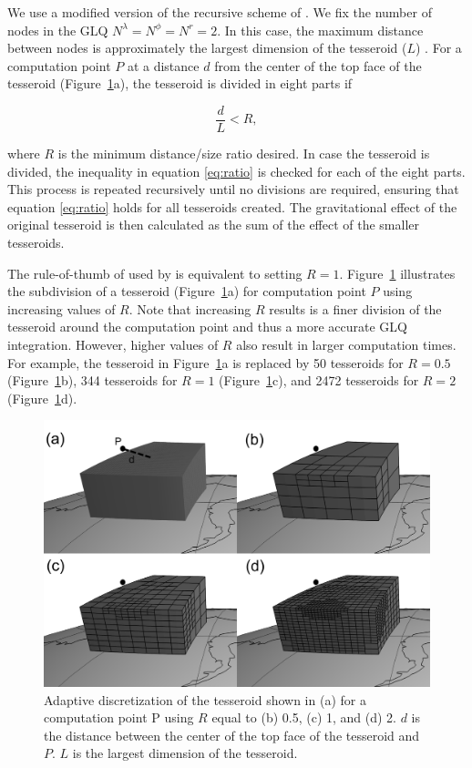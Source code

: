 \documentclass[paper,twocolumn,twoside]{geophysics}
\begin{document}
We use a modified version
of the recursive scheme of \citet{Li2011}.
We fix the number of nodes in the GLQ
$N^\lambda=N^\phi=N^r=2$.
In this case, the maximum distance between nodes
is approximately the largest dimension of the tesseroid ($L$)
\citep{Wild-Pfeiffer2008}.
For a computation point $P$
at a distance $d$ from
the center of the top face of the tesseroid
(Figure~\ref{fig:ratio}a),
the tesseroid is divided in eight parts if

\begin{equation}
    \frac{d}{L} < R,
    \label{eq:ratio}
\end{equation}

\noindent
where $R$ is the minimum distance/size ratio desired.
In case the tesseroid is divided,
the inequality in equation \ref{eq:ratio}
is checked for each of the eight parts.
This process is repeated recursively
until no divisions are required,
ensuring that equation \ref{eq:ratio}
holds for all tesseroids created.
The gravitational effect
of the original tesseroid
is then calculated as
the sum of the effect
of the smaller tesseroids.

The rule-of-thumb of \citet{Ku1977}
used by \citet{Li2011}
is equivalent to setting $R=1$.
Figure~\ref{fig:ratio}
illustrates the subdivision of a tesseroid
(Figure~\ref{fig:ratio}a)
for computation point $P$
using increasing values of $R$.
Note that increasing $R$
results is a finer division of the tesseroid
around the computation point
and thus a more accurate GLQ integration.
However, higher values of $R$
also result in
larger computation times.
For example,
the tesseroid in Figure~\ref{fig:ratio}a
is replaced by
50 tesseroids for $R=0.5$ (Figure~\ref{fig:ratio}b),
344 tesseroids for $R=1$ (Figure~\ref{fig:ratio}c),
and 2472 tesseroids for  $R=2$ (Figure~\ref{fig:ratio}d).

\begin{figure}
    \centering
    \includegraphics[width=\columnwidth]{figs/tesseroid-split}
    \caption{
        Adaptive discretization
        of the tesseroid shown in (a)
        for a computation point P
        using $R$ equal to
        (b) 0.5, (c) 1, and (d) 2.
        $d$ is the distance between
        the center of the top face of the tesseroid
        and $P$.
        $L$ is the largest dimension of the tesseroid.
    }
    \label{fig:ratio}
\end{figure}
\end{document}
